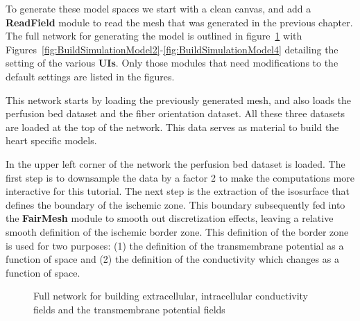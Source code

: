 \documentclass[fleqn,11pt,openany]{book}
\begin{document}
To generate these model spaces we start with a clean canvas, and add a {\bf ReadField} module to read the mesh that was generated in the previous chapter. The full network for generating the model is outlined in figure~\ref{fig:BuildSimulationModel} with Figures~\ref{fig:BuildSimulationModel2}-\ref{fig:BuildSimulationModel4} detailing the setting of the various {\bf UIs}. Only those modules that need modifications to the default settings are listed in the figures.

This network starts by loading the previously generated mesh, and also loads the perfusion bed dataset and the fiber orientation dataset. All these three datasets are loaded at the top of the network. This data serves as material to build the heart specific models.

In the upper left corner of the network the perfusion bed dataset is loaded. The first step is to downsample the data by a factor 2 to make the computations more interactive for this tutorial. The next step is the extraction of the isosurface that defines the boundary of the ischemic zone. This boundary subsequently fed into the {\bf FairMesh} module to smooth out discretization effects, leaving a relative smooth definition of the ischemic border zone. This definition of the border zone is used for two purposes: (1) the definition of the transmembrane potential as a function of space and (2) the definition of the conductivity which changes as a function of space.

\begin{figure}
\caption{Full network for building extracellular, intracellular conductivity fields and the transmembrane potential fields}\label{fig:BuildSimulationModel}
\end{figure}
\end{document}
